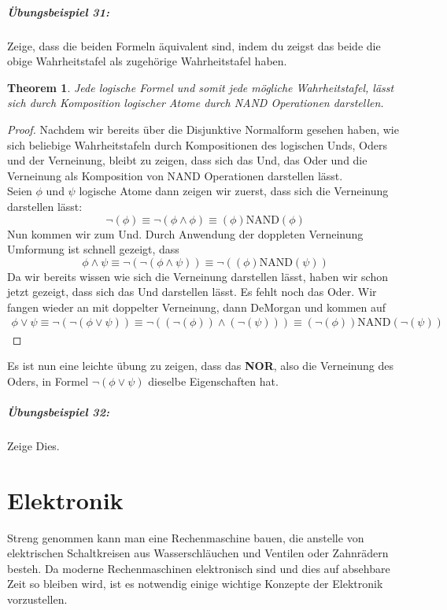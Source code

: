 \documentclass[11pt,a4paper,leqno]{report}
\newtheorem{theorem}{Theorem}[chapter]
\numberwithin{equation}{chapter}
\begin{document}
\paragraph{\"Ubungsbeispiel 31:} Zeige, dass die beiden Formeln \"aquivalent sind, indem du zeigst das beide die obige Wahrheitstafel als zugeh\"orige Wahrheitstafel haben.
\begin{theorem}
	Jede logische Formel und somit jede m\"ogliche Wahrheitstafel, l\"asst sich durch Komposition logischer Atome durch NAND Operationen darstellen.
\end{theorem}
\begin{proof}
	Nachdem wir bereits \"uber die Disjunktive Normalform gesehen haben, wie sich beliebige Wahrheitstafeln durch Kompositionen des logischen Unds, Oders und der Verneinung, bleibt zu zeigen, dass sich das Und, das Oder und die Verneinung als Komposition von NAND Operationen darstellen l\"asst.\\
	Seien $\phi$ und $\psi$ logische Atome dann zeigen wir zuerst, dass sich die Verneinung darstellen l\"asst:
	\begin{equation}
		\neg(\phi) \equiv \neg(\phi\wedge\phi) \equiv (\phi)\text{NAND}(\phi)
	\end{equation}
	Nun kommen wir zum Und.
	Durch Anwendung der doppleten Verneinung Umformung ist schnell gezeigt, dass
	\begin{equation}
	\phi\wedge\psi \equiv \neg(\neg(\phi\wedge\psi)) \equiv \neg((\phi)\text{NAND}(\psi))
	\end{equation}
	Da wir bereits wissen wie sich die Verneinung darstellen l\"asst, haben wir schon jetzt gezeigt, dass sich das Und darstellen l\"asst. Es fehlt noch das Oder. Wir fangen wieder an mit doppelter Verneinung, dann DeMorgan und kommen auf
	\begin{align}
	\phi\vee\psi \equiv \neg(\neg(\phi\vee\psi)) \equiv \neg((\neg(\phi))\wedge(\neg(\psi)))\equiv (\neg(\phi))\text{NAND}(\neg(\psi))
	\end{align}
\end{proof}

Es ist nun eine leichte \"ubung zu zeigen, dass das \textbf{NOR}, also die Verneinung des Oders, in Formel $\neg(\phi\vee\psi)$ dieselbe Eigenschaften hat.
\paragraph{\"Ubungsbeispiel 32:} Zeige Dies.
\chapter{Elektronik}
Streng genommen kann man eine Rechenmaschine bauen, die anstelle von elektrischen Schaltkreisen aus Wasserschl\"auchen und Ventilen oder Zahnr\"adern besteh. Da moderne Rechenmaschinen elektronisch sind und dies auf absehbare Zeit so bleiben wird, ist es notwendig einige wichtige Konzepte der Elektronik vorzustellen.
\end{document}
